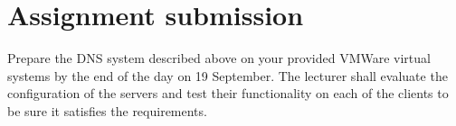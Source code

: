 \documentclass{article}
\begin{document}
\section{Assignment submission}
Prepare the DNS system described above on your provided VMWare virtual systems by  the end of the day on 19 September.  The lecturer shall evaluate the configuration of the servers and test their functionality on each of the clients to be sure it satisfies the requirements. 
\end{document}
